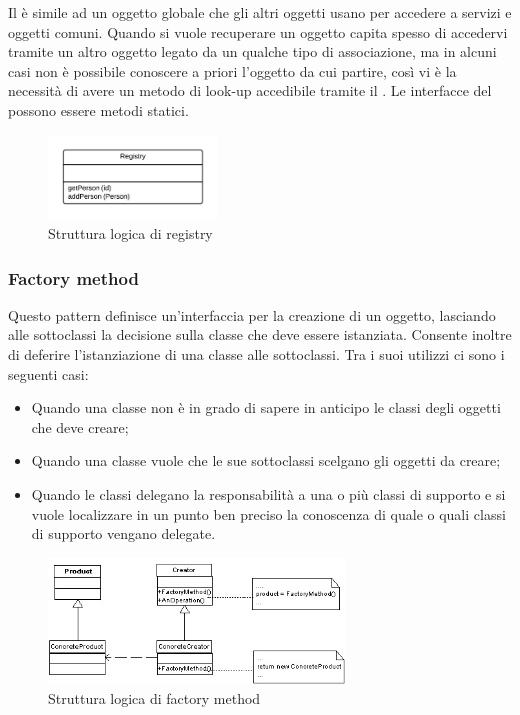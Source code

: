 Il  è simile ad un oggetto globale che gli altri oggetti usano per accedere a servizi e oggetti comuni. Quando si vuole recuperare un oggetto capita spesso di accedervi tramite un altro oggetto legato da un qualche tipo di associazione, ma in alcuni casi non è possibile conoscere a priori l'oggetto da cui partire, così vi è la necessità di avere un metodo di look-up accedibile tramite il . Le interfacce del  possono essere metodi statici.

\begin{figure}[H]
\centering \includegraphics[width=0.4\textwidth]{patterns/registry.png}
\caption{Struttura logica di registry}
\label{fig:registry}
\end{figure}

\subsubsection{Factory method}
	
Questo pattern definisce un'interfaccia per la creazione di un oggetto, lasciando alle sottoclassi la decisione sulla classe che deve essere istanziata. Consente inoltre di deferire l'istanziazione di una classe alle sottoclassi. Tra i suoi utilizzi ci sono i seguenti casi:

\begin{itemize}

	\item Quando una classe non è in grado di sapere in anticipo le classi degli oggetti che deve creare;
	\item Quando una classe vuole che le sue sottoclassi scelgano gli oggetti da creare;
	\item Quando le classi delegano la responsabilità a una o più classi di supporto e si vuole localizzare in un punto ben preciso la conoscenza di quale o quali classi di supporto vengano delegate.

\end{itemize}

\begin{figure}[H]
\centering \includegraphics[width=0.7\textwidth]{patterns/factory-method.jpg}
\caption{Struttura logica di factory method}
\label{fig:factory-method}
\end{figure}

